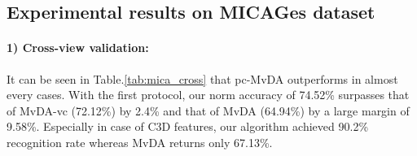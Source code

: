 
\subsection{Experimental results on MICAGes dataset}

    \paragraph{1) Cross-view validation:} It can be seen in Table.\ref{tab:mica_cross} that pc-MvDA outperforms in almost every cases. With the first protocol, our norm accuracy of 74.52\% surpasses that of MvDA-vc (72.12\%) by 2.4\% and that of MvDA (64.94\%) by a large margin of 9.58\%. Especially in case of C3D features, our algorithm achieved 90.2\% recognition rate whereas MvDA returns only 67.13\%.

    \begin{table}[htbp]
    \centering
    \caption{Cross-view recognition comparison on MICAGes dataset}
    \label{tab:mica_cross}
    \end{table}

